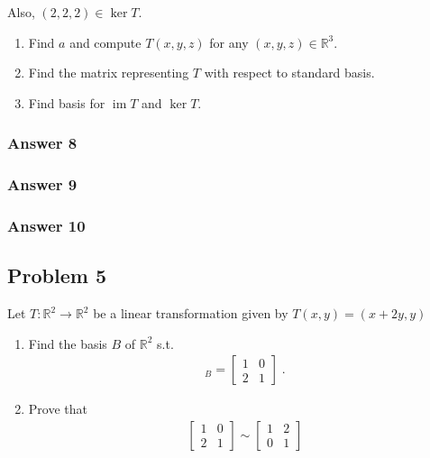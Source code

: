 \documentclass[11pt]{article}
\DeclareMathOperator{\image}{\mathrm{im}}
\begin{document}
Also, $(2, 2, 2) \in \ker T$.
\begin{enumerate}
\item Find $a$ and compute $T(x,y,z)$ for any $(x,y,z) \in \mathbb{R}^3$.
\item Find the matrix representing $T$ with respect to standard basis.
\item Find basis for $\image T$ and $\ker T$.
\end{enumerate}

\subsubsection{Answer 8}
\label{sec-1-4-1}

\subsubsection{Answer 9}
\label{sec-1-4-2}

\subsubsection{Answer 10}
\label{sec-1-4-3}

\subsection{Problem 5}
\label{sec-1-5}
Let $T:\mathbb{R}^2 \to \mathbb{R}^2$ be a linear transformation given by
$T(x,y) = (x+2y,y)$
\begin{enumerate}
\item Find the basis $B$ of $\mathbb{R}^2$ s.t.
\begin{align*}
  [T]_B = \begin{bmatrix}
    1 & 0 \\
    2 & 1
  \end{bmatrix} \;.
\end{align*}

\item Prove that 
\begin{align*}
  \begin{bmatrix}
    1 & 0 \\
    2 & 1
  \end{bmatrix} \sim
  \begin{bmatrix}
    1 & 2 \\
    0 & 1
  \end{bmatrix}
\end{align*}
\end{enumerate}
\end{document}

